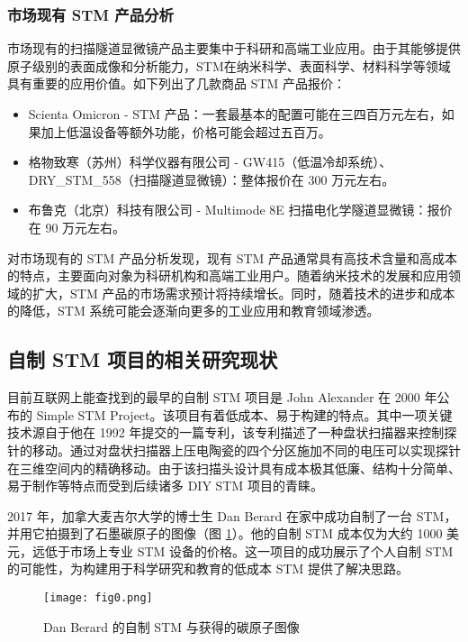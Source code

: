 \documentclass{article}
\begin{document}
\begin{spacing}{1.625}
	\subsubsection[市场现有 STM 产品分析]{市场现有 STM 产品分析}
	市场现有的扫描隧道显微镜产品主要集中于科研和高端工业应用。由于其能够提供原子级别的表面成像和分析能力，STM在纳米科学、表面科学、材料科学等领域具有重要的应用价值。如下列出了几款商品 STM 产品报价：
	\begin{itemize}
		\item Scienta Omicron - STM 产品：一套最基本的配置可能在三四百万元左右，如果加上低温设备等额外功能，价格可能会超过五百万。
		\item 格物致寒（苏州）科学仪器有限公司 - GW415（低温冷却系统）、DRY\_STM\_558（扫描隧道显微镜）：整体报价在 300 万元左右。
		\item 布鲁克（北京）科技有限公司 - Multimode 8E 扫描电化学隧道显微镜：报价在 90 万元左右。
	\end{itemize}
	
	
	对市场现有的 STM 产品分析发现，现有 STM 产品通常具有高技术含量和高成本的特点，主要面向对象为科研机构和高端工业用户。随着纳米技术的发展和应用领域的扩大，STM 产品的市场需求预计将持续增长。同时，随着技术的进步和成本的降低，STM 系统可能会逐渐向更多的工业应用和教育领域渗透。
	
	
	
	\subsection{自制 STM 项目的相关研究现状}
	目前互联网上能查找到的最早的自制 STM 项目是 John Alexander 在 2000 年公布的 Simple STM Project\cite{ref12}。该项目有着低成本、易于构建的特点。其中一项关键技术源自于他在 1992 年提交的一篇专利，该专利描述了一种盘状扫描器来控制探针的移动。通过对盘状扫描器上压电陶瓷的四个分区施加不同的电压可以实现探针在三维空间内的精确移动\cite{ref13}。由于该扫描头设计具有成本极其低廉、结构十分简单、易于制作等特点而受到后续诸多 DIY STM 项目的青睐。
	
	2017 年，加拿大麦吉尔大学的博士生 Dan Berard 在家中成功自制了一台 STM，并用它拍摄到了石墨碳原子的图像（图 \ref{fig0}）\cite{ref11}。他的自制 STM 成本仅为大约 1000 美元，远低于市场上专业 STM 设备的价格。这一项目的成功展示了个人自制 STM 的可能性，为构建用于科学研究和教育的低成本 STM 提供了解决思路。
	
	\begin{figure}[!htbp]
		\centering
		\texttt{[image: fig0.png]}
		\caption{Dan Berard 的自制 STM 与获得的碳原子图像}
		\label{fig0}
	\end{figure}
	

\end{spacing}
\end{document}
